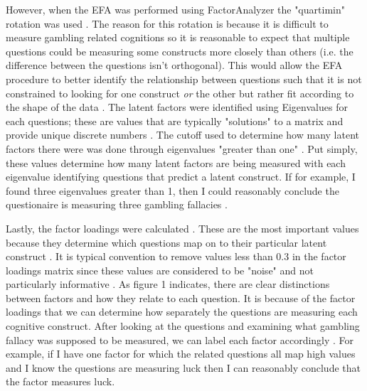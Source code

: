 \documentclass[twoside,twocolumn]{article}
\begin{document}
However, when the EFA was performed using FactorAnalyzer the "quartimin" rotation was used \cite{factoranalyzer}. The reason for this rotation is because it is difficult to measure gambling related cognitions so it is reasonable to expect that multiple questions could be measuring some constructs more closely than others (i.e. the difference between the questions isn't orthogonal)\cite{efa}. This would allow the EFA procedure to better identify the relationship between questions such that it is not constrained to looking for one construct \emph{or} the other but rather fit according to the shape of the data \cite{efa}. The latent factors were identified using Eigenvalues for each questions; these are values that are typically "solutions" to a matrix and provide unique discrete numbers \cite{lay}. The cutoff used to determine how many latent factors there were was done through eigenvalues "greater than one" \cite{efa}. Put simply, these values determine how many latent factors are being measured with each eigenvalue identifying questions that predict a latent construct. If for example, I found three eigenvalues greater than 1, then I could reasonably conclude the questionaire is measuring three gambling fallacies \cite{efa, lay}.

Lastly, the factor loadings were calculated \cite{factoranalyzer}. These are the most important values because they determine which questions map on to their particular latent construct \cite{efa}. It is typical convention  to remove values less than 0.3 in the factor loadings matrix since these values are considered to be "noise" and not particularly informative \cite{efa}. As figure 1 indicates, there are clear distinctions between factors and how they relate to each question. It is because of the factor loadings that we can determine how separately the questions are measuring each cognitive construct. After looking at the questions and examining what gambling fallacy was supposed to be measured, we can label each factor accordingly \cite{efa}. For example, if I have one factor for which the related questions all map high values and I know the questions are measuring luck then I can reasonably conclude that the factor measures luck.
\end{document}
